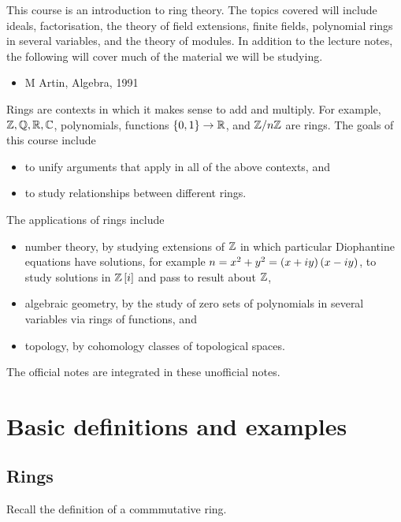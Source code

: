 This course is an introduction to ring theory. The topics covered will include ideals, factorisation, the theory of field extensions, finite fields, polynomial rings in several variables, and the theory of modules. In addition to the lecture notes, the following will cover much of the material we will be studying.
\begin{itemize}
\item M Artin, Algebra, 1991
\end{itemize}
Rings are contexts in which it makes sense to add and multiply. For example, $ \mathbb{Z}, \mathbb{Q}, \mathbb{R}, \mathbb{C} $, polynomials, functions $ \cbr{0, 1} \to \R $, and $ \mathbb{Z} / n\mathbb{Z} $ are rings. The goals of this course include
\begin{itemize}
\item to unify arguments that apply in all of the above contexts, and
\item to study relationships between different rings.
\end{itemize}
The applications of rings include
\begin{itemize}
\item number theory, by studying extensions of $ \mathbb{Z} $ in which particular Diophantine equations have solutions, for example $ n = x^2 + y^2 = \br{x + iy}\br{x - iy} $, to study solutions in $ \Z\sbr{i} $ and pass to result about $ \mathbb{Z} $,
\item algebraic geometry, by the study of zero sets of polynomials in several variables via rings of functions, and
\item topology, by cohomology classes of topological spaces.
\end{itemize}
The official notes are integrated in these unofficial notes.

\pagebreak

\section{Basic definitions and examples}

\subsection{Rings}

Recall the definition of a commmutative ring.

